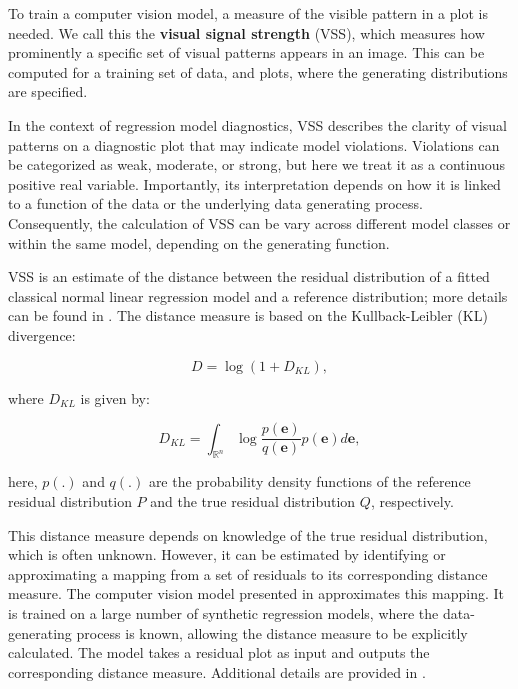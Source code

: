 \documentclass[
doublespace,
  times]{anzsauth}
\begin{document}
To train a computer vision model, a measure of the visible pattern in a
plot is needed. We call this the \textbf{visual signal strength} (VSS),
which measures how prominently a specific set of visual patterns appears
in an image. This can be computed for a training set of data, and plots,
where the generating distributions are specified.

In the context of regression model diagnostics, VSS describes the
clarity of visual patterns on a diagnostic plot that may indicate model
violations. Violations can be categorized as weak, moderate, or strong,
but here we treat it as a continuous positive real variable.
Importantly, its interpretation depends on how it is linked to a
function of the data or the underlying data generating process.
Consequently, the calculation of VSS can be vary across different model
classes or within the same model, depending on the generating function.

VSS is an estimate of the distance between the residual distribution of
a fitted classical normal linear regression model and a reference
distribution; more details can be found in \citet{li2024automated}. The
distance measure is based on the Kullback-Leibler (KL) divergence:

\begin{equation*} \label{eq:kl-0}
D = \log\left(1 + D_{KL}\right),
\end{equation*}

where \(D_{KL}\) is given by:

\begin{equation*} \label{eq:kl-1}
D_{KL} = \int_{\mathbb{R}^{n}}\log\frac{p(\boldsymbol{e})}{q(\boldsymbol{e})}p(\boldsymbol{e})d\boldsymbol{e},
\end{equation*}

here, \(p(.)\) and \(q(.)\) are the probability density functions of the
reference residual distribution \(P\) and the true residual distribution
\(Q\), respectively.

This distance measure depends on knowledge of the true residual
distribution, which is often unknown. However, it can be estimated by
identifying or approximating a mapping from a set of residuals to its
corresponding distance measure. The computer vision model presented in
\citet{li2024automated} approximates this mapping. It is trained on a
large number of synthetic regression models, where the data-generating
process is known, allowing the distance measure to be explicitly
calculated. The model takes a residual plot as input and outputs the
corresponding distance measure. Additional details are provided in
\citet{li2024automated}.
\end{document}
